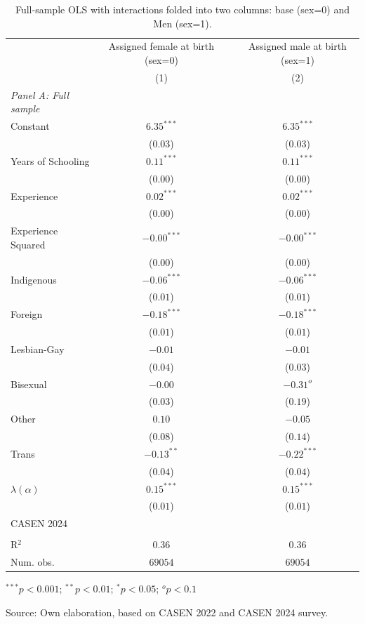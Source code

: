 \begin{table}[H]
\begin{center}
\begin{threeparttable}
\captionsetup{margin=0.5cm}
\caption{Full-sample OLS with interactions folded into two columns: base (sex=0) and Men (sex=1).}
\label{AT1_full_2cols}
\footnotesize
\centering
\begin{tabular}{lccc}
\toprule
 & \multicolumn{1}{c}{Assigned female at birth (sex=0)} & & \multicolumn{1}{c}{Assigned male at birth (sex=1)} \\ 
 & (1) & & (2) \\ \midrule
\textit{Panel A: Full sample} & &  &  \\ 
Constant & $6.35^{***}$ & & $6.35^{***}$ \\ 
 & ($0.03$) & & ($0.03$) \\ 
Years of Schooling & $0.11^{***}$ & & $0.11^{***}$ \\ 
 & ($0.00$) & & ($0.00$) \\ 
Experience & $0.02^{***}$ & & $0.02^{***}$ \\ 
 & ($0.00$) & & ($0.00$) \\ 
Experience Squared & $-0.00^{***}$ & & $-0.00^{***}$ \\ 
 & ($0.00$) & & ($0.00$) \\ 
Indigenous & $-0.06^{***}$ & & $-0.06^{***}$ \\ 
 & ($0.01$) & & ($0.01$) \\ 
Foreign & $-0.18^{***}$ & & $-0.18^{***}$ \\ 
 & ($0.01$) & & ($0.01$) \\ 
Lesbian-Gay & $-0.01$ & & $-0.01$ \\ 
 & ($0.04$) & & ($0.03$) \\ 
Bisexual & $-0.00$ & & $-0.31^{o}$ \\ 
 & ($0.03$) & & ($0.19$) \\ 
Other & $0.10$ & & $-0.05$ \\ 
 & ($0.08$) & & ($0.14$) \\ 
Trans & $-0.13^{**}$ & & $-0.22^{***}$ \\ 
 & ($0.04$) & & ($0.04$) \\ 
$\lambda(\alpha)$ & $0.15^{***}$ & & $0.15^{***}$ \\ 
 & ($0.01$) & & ($0.01$) \\ 
CASEN 2024 &  & &  \\ 
 &  & &  \\ 
R$^2$ & $0.36$ & & $0.36$ \\ 
Num. obs. & $69054$ & & $69054$ \\ \bottomrule
\end{tabular}
\begin{tablenotes}
\item ${}^{***}p<0.001$; ${}^{**}p<0.01$; ${}^{*}p<0.05$; ${}^{o}p<0.1$
\item Source: Own elaboration, based on CASEN 2022 and CASEN 2024 survey.
\end{tablenotes}
\end{threeparttable}
\end{center}
\end{table}